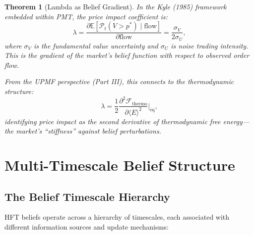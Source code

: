 \documentclass[12pt,a4paper]{article}
\newtheorem{theorem}{Theorem}[section]
\theoremstyle{definition}
\newcommand{\E}{\mathbb{E}}
\newcommand{\F}{\mathcal{F}}
\newcommand{\PP}{\mathcal{P}}
\begin{document}
\begin{theorem}[Lambda as Belief Gradient]\label{thm:kyle-belief}
In the Kyle (1985) framework embedded within PMT, the price impact coefficient is:
\begin{equation}
  \lambda = \frac{\partial \E[\PP_t(V > p^*) \mid \mathrm{flow}]}{\partial \mathrm{flow}} = \frac{\sigma_V}{2\sigma_U},
\end{equation}
where $\sigma_V$ is the fundamental value uncertainty and $\sigma_U$ is noise trading intensity. This is the \emph{gradient of the market's belief function with respect to observed order flow}.

From the UPMF perspective (Part III), this connects to the thermodynamic structure:
\begin{equation}
  \lambda = \frac{1}{2} \frac{\partial^2 \F_{\mathrm{thermo}}}{\partial \langle E \rangle^2}\bigg|_{\mathrm{eq}},
\end{equation}
identifying price impact as the second derivative of thermodynamic free energy---the market's ``stiffness'' against belief perturbations.
\end{theorem}

\section{Multi-Timescale Belief Structure}\label{sec:belief-timescales}

\subsection{The Belief Timescale Hierarchy}

HFT beliefs operate across a hierarchy of timescales, each associated with different information sources and update mechanisms:
\end{document}
